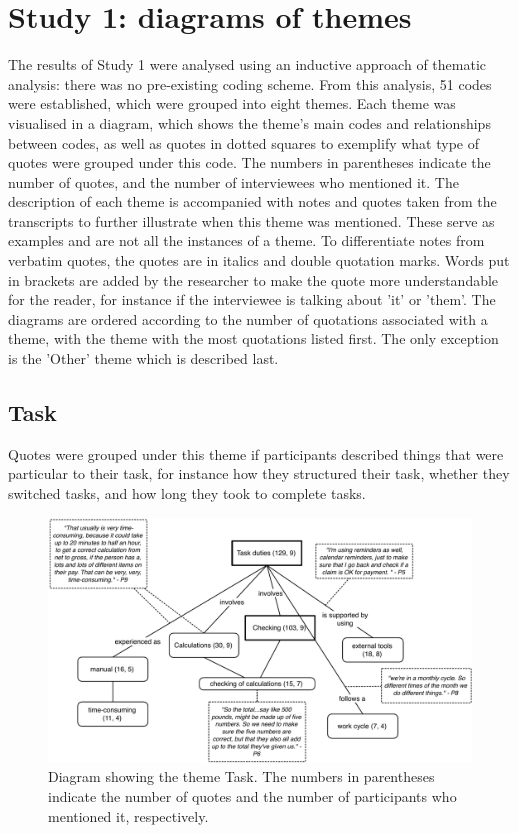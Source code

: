 \chapter{Study 1: diagrams of themes}\label{ch:S1_Diagrams}
The results of Study 1 were analysed using an inductive approach of thematic analysis: there was no pre-existing coding scheme. From this analysis, 51 codes were established, which were grouped into eight themes. Each theme was visualised in a diagram, which shows the theme's main codes and relationships between codes, as well as quotes in dotted squares to exemplify what type of quotes were grouped under this code. The numbers in parentheses indicate the number of quotes, and the number of interviewees who mentioned it. 
The description of each theme is accompanied with notes and quotes taken from the transcripts to further illustrate when this theme was mentioned. These serve as examples and are not all the instances of a theme. To differentiate notes from verbatim quotes, the quotes are in italics and double quotation marks. Words put in brackets are added by the researcher to make the quote more understandable for the reader, for instance if the interviewee is talking about 'it' or 'them'. The diagrams are ordered according to the number of quotations associated with a theme, with the theme with the most quotations listed first. The only exception is the 'Other' theme which is described last.

\newpage

\section{Task}
Quotes were grouped under this theme if participants described things that were particular to their task, for instance how they structured their task, whether they switched tasks, and how long they took to complete tasks.

\begin{figure}[!ht]
\centering
\includegraphics[width=\textwidth]{images/ch12/Task.pdf}
\caption[Study 1 Task diagram]{Diagram showing the theme Task. The numbers in parentheses indicate the number of quotes and the number of participants who mentioned it, respectively.}
\vspace{-9pt}
\label{fig:ch3_task}
\end{figure}

